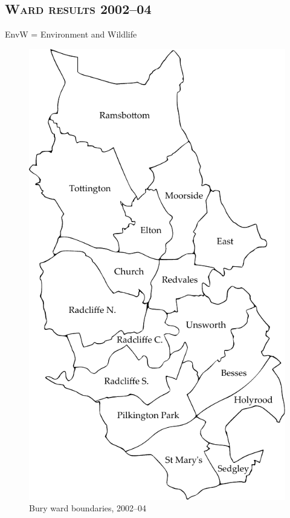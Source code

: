 \subsection*{\scshape Ward results 2002--04}

EnvW = Environment and Wildlife

\begin{figure}
\centering
\includegraphics[height=0.9\textheight]{source/bury02}
\caption{Bury ward boundaries, 2002--04}
\end{figure}

